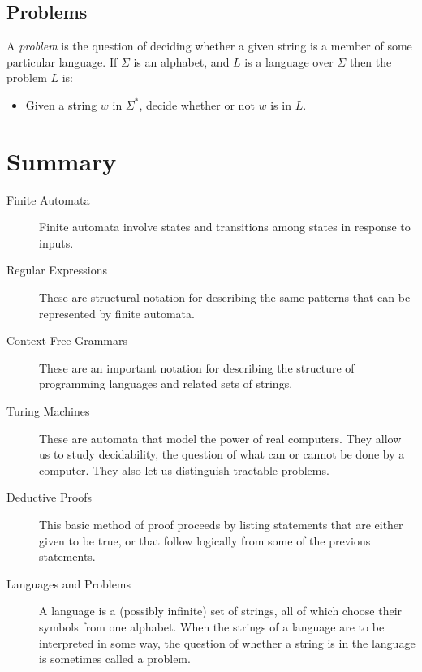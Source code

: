 \documentclass[]{article}
\begin{document}
  \subsection*{Problems}
    A \emph{problem} is the question of deciding whether a given string is a 
    member of some particular language. If $\Sigma$ is an alphabet, and $L$ is 
    a language over $\Sigma$ then the problem $L$ is:
      \begin{itemize}
        \item Given a string $w$ in $\Sigma^*$, decide whether or not $w$ is in   
        $L$.
      \end{itemize}
      
\section*{Summary}
  \begin{description}
    \item[Finite Automata] Finite automata involve states and transitions among 
    states in response to inputs.
    \item[Regular Expressions] These are structural notation for describing the 
    same patterns that can be represented by finite automata.
    \item[Context-Free Grammars] These are an important notation for describing
    the structure of programming languages and related sets of strings.
    \item[Turing Machines] These are automata that model the power of real 
    computers. They allow us to study decidability, the question of what can or 
    cannot be done by a computer. They also let us distinguish tractable 
    problems.
    \item[Deductive Proofs] This basic method of proof proceeds by listing 
    statements that are either given to be true, or that follow logically from 
    some of the previous statements.
    \item[Languages and Problems] A language is a (possibly infinite) set of 
    strings, all of which choose their symbols from one alphabet. When the 
    strings of a language are to be interpreted in some way, the question of 
    whether a string is in the language is sometimes called a problem.
  \end{description}
       
\end{document}
